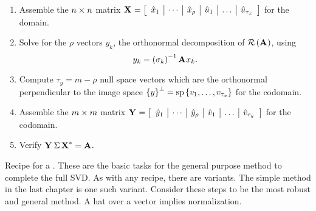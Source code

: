 \begin{table}[h]
\begin{enumerate}
\item Assemble the $\by{n}{n}$ matrix 
$\X{}=\mat{c|c|c|c|c|c}
{\hat{x}_{1} & \cdots & \hat{x}_{\rho} & \hat{u}_{1} & \dots & \hat{u}_{\tau_{x}}
}
$
for the domain.\\[4pt]
\item Solve for the $\rho$ vectors $y_{k}$, the orthonormal decomposition of $\rng{\A{}}$, using
\begin{equation}
  y_{k} = \paren{\sigma_{k}}^{-1}\A{} x_{k}.
\end{equation}
\item Compute $\tau_{y}=m-\rho$ null space vectors which are the  orthonormal perpendicular to the image space $\lst{y}^{\perp}=\spn\lst{v_{1},\dots,v_{\tau_{x}}}$ for the codomain.\\[4pt]
\item Assemble the $\by{m}{m}$ matrix 
$\Y{}=\mat{c|c|c|c|c|c}
{\hat{y}_{1} & \cdots & \hat{y}_{\rho} & \hat{v}_{1} & \dots & \hat{v}_{\tau_{y}}
}
$ for the codomain.\\[4pt]
\item Verify $\svd{*} = \A{}.$\\[6pt]
\end{enumerate}
\caption{Recipe for a \svdl. These are the basic tasks for the general purpose method to complete the full SVD. As with any recipe, there are variants. The simple method in the last chapter is one such variant. Consider these steps to be the most robust and general method. A hat over a vector implies normalization.}
\label{tab:3:input}
\end{table}

\clearpage
\break

\endinput